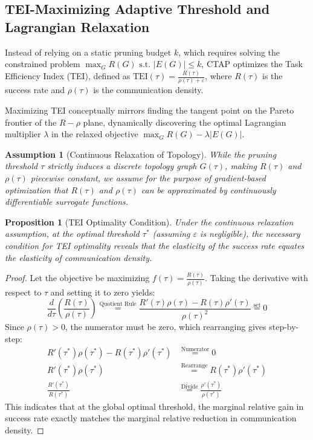 \documentclass{article}
\newtheorem{assumption}{Assumption}
\newtheorem{proposition}[theorem]{Proposition}
\begin{document}
\subsection{TEI-Maximizing Adaptive Threshold and Lagrangian Relaxation}
Instead of relying on a static pruning budget $k$, which requires solving the constrained problem $\max_G R(G) \text{ s.t. } |E(G)| \le k$, CTAP optimizes the Task Efficiency Index (TEI), defined as $\text{TEI}(\tau) = \frac{R(\tau)}{\rho(\tau) + \varepsilon}$, where $R(\tau)$ is the success rate and $\rho(\tau)$ is the communication density. 

Maximizing TEI conceptually mirrors finding the tangent point on the Pareto frontier of the $R-\rho$ plane, dynamically discovering the optimal Lagrangian multiplier $\lambda$ in the relaxed objective $\max_G R(G) - \lambda |E(G)|$.

\begin{assumption}[Continuous Relaxation of Topology]
While the pruning threshold $\tau$ strictly induces a discrete topology graph $G(\tau)$, making $R(\tau)$ and $\rho(\tau)$ piecewise constant, we assume for the purpose of gradient-based optimization that $R(\tau)$ and $\rho(\tau)$ can be approximated by continuously differentiable surrogate functions.
\end{assumption}

\begin{proposition}[TEI Optimality Condition]
Under the continuous relaxation assumption, at the optimal threshold $\tau^*$ (assuming $\varepsilon$ is negligible), the necessary condition for TEI optimality reveals that the elasticity of the success rate equates the elasticity of communication density.
\end{proposition}

\begin{proof}
Let the objective be maximizing $f(\tau) = \frac{R(\tau)}{\rho(\tau)}$. Taking the derivative with respect to $\tau$ and setting it to zero yields:
\begin{equation}
    \frac{d}{d\tau} \left( \frac{R(\tau)}{\rho(\tau)} \right) \overset{\text{Quotient Rule}}{=} \frac{R'(\tau)\rho(\tau) - R(\tau)\rho'(\tau)}{\rho(\tau)^2} \overset{\text{set}}{=} 0
\end{equation}
Since $\rho(\tau) > 0$, the numerator must be zero, which rearranging gives step-by-step:
\begin{align}
    R'(\tau^*)\rho(\tau^*) - R(\tau^*)\rho'(\tau^*) &\overset{\text{Numerator}}{=} 0 \\
    R'(\tau^*)\rho(\tau^*) &\overset{\text{Rearrange}}{=} R(\tau^*)\rho'(\tau^*) \\
    \frac{R'(\tau^*)}{R(\tau^*)} &\overset{\text{Divide}}{=} \frac{\rho'(\tau^*)}{\rho(\tau^*)}
\end{align}
This indicates that at the global optimal threshold, the marginal relative gain in success rate exactly matches the marginal relative reduction in communication density.
\end{proof}
\end{document}
